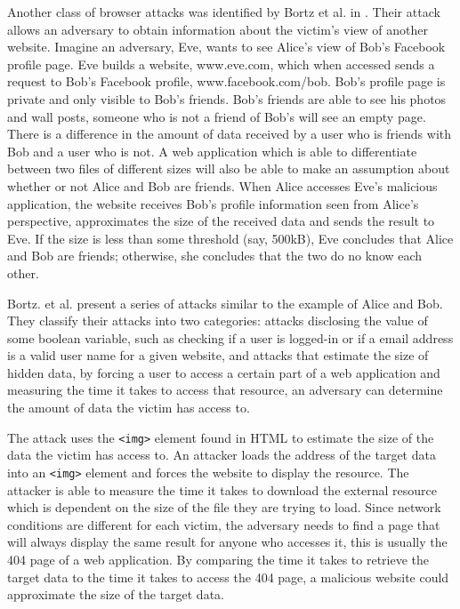 \documentclass[10pt,a4paper,twoside]{book}
\begin{document}
Another class of browser attacks was identified by Bortz et al. in \cite{bortz2007exposing}. Their attack allows an adversary to obtain information about the victim's view of another website. Imagine an adversary, Eve, wants to see Alice's view of Bob's Facebook profile page. Eve builds a website, www.eve.com, which when accessed sends a request to Bob's Facebook profile, www.facebook.com/bob. Bob's profile page is private and only visible to Bob's friends. Bob's friends are able to see his photos and wall posts, someone who is not a friend of Bob's will see an empty page. There is a difference in the amount of data received by a user who is friends with Bob and a user who is not. A web application which is able to differentiate between two files of different sizes will also be able to make an assumption about whether or not Alice and Bob are friends. When Alice accesses Eve's malicious application, the website receives Bob's profile information seen from Alice's perspective, approximates the size of the received data and sends the result to Eve. If the size is less than some threshold (say, 500kB), Eve concludes that Alice and Bob are friends; otherwise, she concludes that the two do no know each other.

Bortz. et al. present a series of attacks similar to the example of Alice and Bob. They classify their attacks into two categories: attacks disclosing the value of some boolean variable, such as checking if a user is logged-in or if a email address is a valid user name for a given website, and attacks that estimate the size of hidden data, by forcing a user to access a certain part of a web application and measuring the time it takes to access that resource, an adversary can determine the amount of data the victim has access to.

The attack uses the \texttt{<img>} element found in HTML to estimate the size of the data the victim has access to. An attacker loads the address of the target data into an \texttt{<img>} element and 
forces the website to display the resource. The attacker is able to measure the time it takes to download the external resource which is dependent on the size of the file they are trying to load. Since network conditions are different for each victim, the adversary needs to find a page that will always display the same result for anyone who accesses it, this is usually the 404 page of a web application. By comparing the time it takes to retrieve the target data to the time it takes to access the 404 page, a malicious website could approximate the size of the target data.
\end{document}
